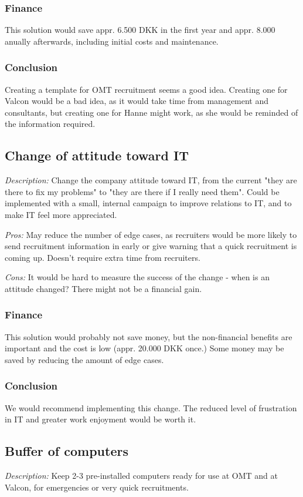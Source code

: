 \subsubsection{Finance}
This solution would save appr. 6.500 DKK in the first year and appr. 8.000 anually afterwards, including initial costs and maintenance.

\subsubsection{Conclusion} Creating a template for OMT recruitment seems a good idea.
Creating one for Valcon would be a bad idea, as it would take time from management and consultants, but creating one for Hanne might work, as she would be reminded of the information required.

\subsection{Change of attitude toward IT}
\emph{Description:} Change the company attitude toward IT, from the current "they are there to fix my problems" to "they are there if I really need them".
Could be implemented with a small, internal campaign to improve relations to IT, and to make IT feel more appreciated.

\emph{Pros:} May reduce the number of edge cases, as recruiters would be more likely to send recruitment information in early or give warning that a quick recruitment is coming up.
Doesn't require extra time from recruiters.

\emph{Cons:} It would be hard to measure the success of the change - when is an attitude changed?
There might not be a financial gain.

\subsubsection{Finance} 
This solution would probably not save money, but the non-financial benefits are important and the cost is low (appr. 20.000 DKK once.)
Some money may be saved by reducing the amount of edge cases.

\subsubsection{Conclusion} 
We would recommend implementing this change. 
The reduced level of frustration in IT and greater work enjoyment would be worth it.

\subsection{Buffer of computers}
\emph{Description:} Keep 2-3 pre-installed computers ready for use at OMT and at Valcon, for emergencies or very quick recruitments.

